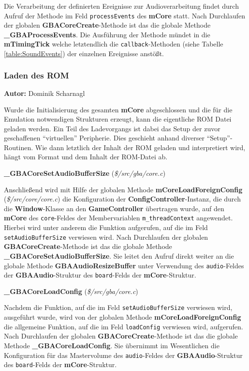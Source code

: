 \documentclass[11pt,a4paper]{scrartcl}
\newcommand{\AutorDominik} {
    \vspace{-4mm}
    \large \textbf{Autor:} Dominik Scharnagl \normalsize
    \vspace{2mm}
}
\newcommand{\paratitlecode}[2] {
    \vspace{5mm}
    \large \textbf{#1} \normalsize(\textit{\${#2}})
    \vspace{2mm}\newline
}
\begin{document}
Die Verarbeitung der definierten Ereignisse zur Audioverarbeitung findet durch Aufruf der Methode im Feld \verb|processEvents| des \textbf{mCore} statt. Nach Durchlaufen der globalen \textbf{GBACoreCreate}-Methode ist das die globale Methode \textbf{{\_}GBAProcessEvents}. Die Ausf\"uhrung der Methode m\"undet in die \textbf{mTimingTick} welche letztendlich die \verb|callback|-Methoden (siehe Tabelle \ref{table:SoundEvents}) der einzelnen Ereignisse anst\"o{\ss}t.


\newpage
\subsubsection{Laden des ROM}
\AutorDominik

Wurde die Initialisierung des gesamten \textbf{mCore} abgeschlossen und die f\"ur die Emulation notwendigen Strukturen erzeugt, kann die eigentliche ROM Datei geladen werden. Ein Teil des Ladevorgangs ist dabei das Setup der zuvor geschaffenen \enquote{virtuellen} Peripherie. Dies geschieht anhand diverser \enquote{Setup}-Routinen. Wie dann letztlich der Inhalt der ROM geladen und interpretiert wird, h\"angt vom Format und dem Inhalt der ROM-Datei ab.

\paratitlecode{{\_}GBACoreSetAudioBufferSize}{/src/gba/core.c}
Anschlie{\ss}end wird mit Hilfe der globalen Methode \textbf{mCoreLoadForeignConfig} (\textit{\$/src/core/core.c}) die Konfiguration der \textbf{ConfigController}-Instanz, die durch die \textbf{Window}-Klasse an den \textbf{GameController} \"ubertragen wurde, auf den \textbf{mCore} des \verb|core|-Feldes der Membervariablen \verb|m_threadContext| angewendet. Hierbei wird unter anderem die Funktion aufgerufen, auf die im Feld \verb|setAudioBufferSize| verwiesen wird. Nach Durchlaufen der globalen \textbf{GBACoreCreate}-Methode ist das die globale Methode \textbf{{\_}GBACoreSetAudioBufferSize}. Sie leitet den Aufruf direkt weiter an die globale Methode \textbf{GBAAudioResizeBuffer} unter Verwendung des \verb|audio|-Feldes der \textbf{GBAAudio}-Struktur des \verb|board|-Felds der \textbf{mCore}-Struktur.

\paratitlecode{{\_}GBACoreLoadConfig}{/src/gba/core.c}
Nachdem die Funktion, auf die im Feld \verb|setAudioBufferSize| verwiesen wird, ausgef\"uhrt wurde, wird von der globalen Methode \textbf{mCoreLoadForeignConfig} die allgemeine Funktion, auf die im Feld \verb|loadConfig| verwiesen wird, aufgerufen. Nach Durchlaufen der globalen \textbf{GBACoreCreate}-Methode ist das die globale Methode \textbf{{\_}GBACoreLoadConfig}. Sie \"ubernimmt im Wesentlichen die Konfiguration f\"ur das Mastervolume des \verb|audio|-Feldes der \textbf{GBAAudio}-Struktur des \verb|board|-Felds der \textbf{mCore}-Struktur.
\end{document}
